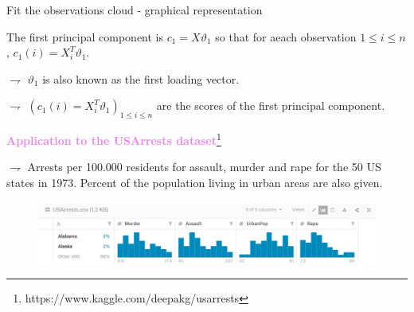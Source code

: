 \documentclass[9pt]{beamer}
\begin{document}
\begin{frame}{Fit the observations cloud - graphical representation}

The first principal component is  $c_1 = X\vartheta_1$ so that for aeach observation $1\leqslant i \leqslant n$, $c_1(i) = X^T_i\vartheta_1$.

$\rightharpoondown$ $\vartheta_1$ is also known as the \textcolor{lighto}{first loading vector}.

$\rightharpoondown$ $(c_1(i) = X^T_i\vartheta_1)_{1\leqslant i\leqslant n}$ are \textcolor{lighto}{the scores of the first principal component}.

\vspace{.3cm}

\textcolor{violet}{{\bf Application to the USArrests dataset}}\footnote{https://www.kaggle.com/deepakg/usarrests}

$\rightharpoondown$ Arrests per 100.000 residents for assault, murder and rape for the 50 US states in 1973. Percent of the population living in urban areas are also given.

\vspace{.1cm}

\begin{figure}[H]
\begin{center}
\includegraphics[scale=0.45]{usarrests} 
\end{center}
\end{figure}

\end{frame}
\end{document}
